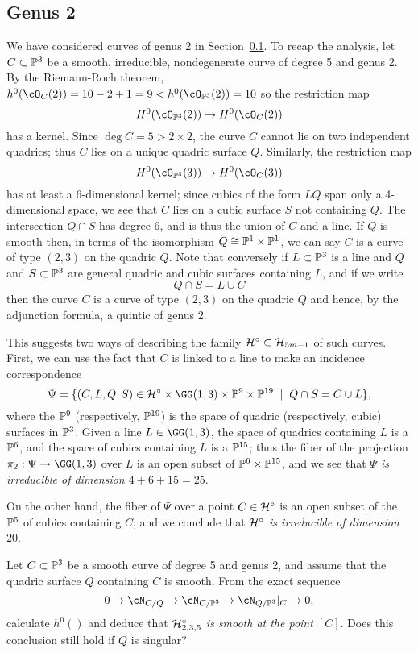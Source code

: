 \subsection{Genus 2}

We have considered curves of genus 2 in Section~\ref{}.  To recap the analysis, let $C \subset \PP^3$ be a smooth, irreducible, nondegenerate curve of degree 5 and genus 2. By the Riemann-Roch theorem,  $h^0(\cO_C(2)) = 10-2+1 = 9<h^0(\cO_{\PP^3}(2)) = 10$  so the restriction map
$$
H^0(\cO_{\PP^3}(2)) \to H^0(\cO_C(2))
$$
has a kernel. Since $\deg C = 5 > 2\times 2$, the curve $C$ cannot lie on two independent quadrics; thus $C$ lies on a unique quadric surface $Q$. Similarly, the restriction map
$$
H^0(\cO_{\PP^3}(3)) \to H^0(\cO_C(3))
$$
has at least a 6-dimensional kernel; since cubics of the form $LQ$ span only a 4-dimensional space, we see that $C$ lies on a cubic surface $S$ not containing $Q$. The intersection $Q\cap S$
has degree 6, and is thus the union of $C$ and a line. If $Q$ is smooth then, in terms of the isomorphism $Q \cong \PP^1 \times \PP^1$, we can say $C$ is a curve of type $(2,3)$ on the quadric $Q$. Note that conversely if $L \subset \PP^3$ is a line and $Q$ and $S \subset \PP^3$ are general quadric and cubic surfaces containing $L$, and if we write
$$
Q \cap S = L \cup C
$$ 
then the curve $C$ is a curve of type $(2,3)$ on the quadric $Q$ and hence, by the adjunction formula,
 a quintic of genus 2.

This suggests two ways of describing the family $\cH^\circ \subset \cH_{5m-1}$ of such curves. First, we can use the fact that $C$ is linked to a line to make an incidence correspondence
$$
\Psi = \{ (C, L, Q, S) \in \cH^\circ \times \GG(1,3) \times \PP^9 \times \PP^{19} \; \mid \; Q \cap S = C \cup L \},
$$
where the $\PP^9$ (respectively, $\PP^{19}$) is the space of quadric (respectively, cubic) surfaces in $\PP^3$. Given a line $L \in \GG(1,3)$, the space of quadrics containing $L$ is a $\PP^6$, and the space of cubics containing $L$ is a $\PP^{15}$; thus the fiber of the projection $\pi_2 : \Psi \to \GG(1,3)$ over $L$ is an open subset of $\PP^6 \times \PP^{15}$, and we see that \emph{$\Psi$ is irreducible of dimension $4 + 6 + 15 = 25$}.

On the other hand, the fiber of $\Psi$ over a point $C \in \cH^\circ$ is an open subset of the $\PP^5$ of cubics containing $C$; and we conclude that \emph{$\cH^\circ$ is irreducible of dimension $20$}.

\begin{exercise}
Let $C \subset \PP^3$ be a smooth curve of degree 5 and genus 2, and assume that the quadric surface $Q$ containing $C$ is smooth. From the exact sequence
$$
0 \to \cN_{C/Q} \to  \cN_{C/\PP^3} \to  \cN_{Q/\PP^3}|_C \to 0,
$$
calculate $h^0()$ and deduce that \emph{$\cH^\circ_{2,3,5}$ is smooth at the point $[C]$}. Does  this conclusion still hold if $Q$ is singular?
\end{exercise}

